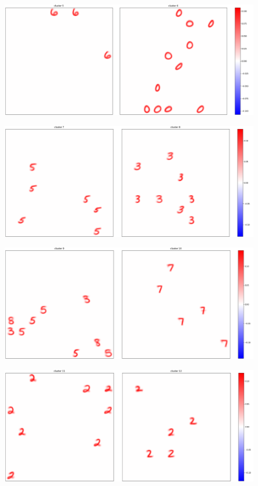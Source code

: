 \documentclass[a4paper]{report}
\begin{document}
\begin{figure} [H]
    \centering
    \includegraphics [width=\textwidth ] {c/h/5.png}
    \caption{}
\end{figure}

\begin{figure} [H]
    \centering
    \includegraphics [width=\textwidth ] {c/h/7.png}
    \caption{}
\end{figure}

\begin{figure} [H]
    \centering
    \includegraphics [width=\textwidth ] {c/h/9.png}
    \caption{}
\end{figure}

\begin{figure} [H]
    \centering
    \includegraphics [width=\textwidth ] {c/h/11.png}
    \caption{}
\end{figure}
\end{document}
